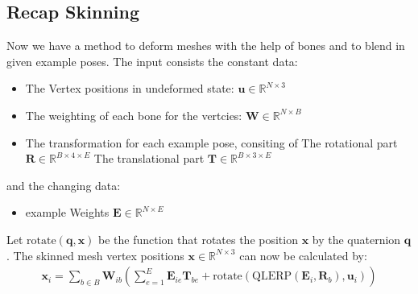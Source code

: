 \subsection{Recap Skinning}
Now we have a method to deform meshes with the help of bones and to blend in given example poses.
The input consists the constant data:
\begin{itemize}
\item The Vertex positions in undeformed state: $\bm u\in\mathbb{R}^{N\times 3}$
\item The weighting of each bone for the vertcies: $\bm W\in\mathbb{R} ^{N \times B}$
\item The transformation for each example pose, consiting of
	\subitem The rotational part $\bm R\in\mathbb{R}^{B\times 4\times  E}$
	\subitem The translational part $\bm T\in\mathbb{R}^{B \times 3\times E}$
\end{itemize}
and the changing data:
\begin{itemize}
	\item example Weights $\bm{E}\in\mathbb{R}^{N\times E}$
\end{itemize}
Let $\text{rotate} (\bm{q},\bm{x})$ be the function that rotates the position $\bm{x}$ by the quaternion $\bm{q}$.
The skinned mesh vertex positions $\bm{x} \in \mathbb{R}^{N\times 3}$ can now be calculated by:
\begin{align}
\bm{x}_i = \sum_{b\in B} \bm{W}_{ib}\left(\sum_{e=1}^{E}\bm{E}_{ie}\bm{T}_{be} + \text{rotate}(\text{QLERP}(\bm{E}_i,\bm{R}_b),\bm{u}_i)\right)
\end{align}

